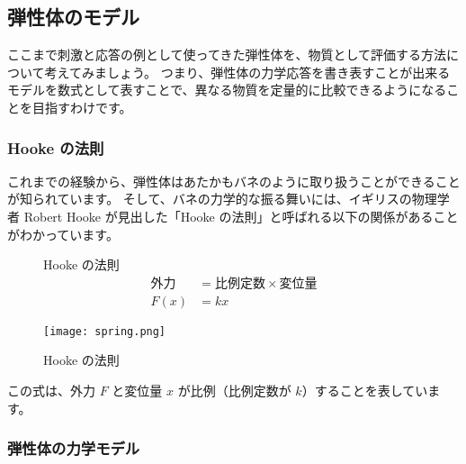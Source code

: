 \documentclass[uplatex,dvipdfmx,a4paper,11pt]{jsreport}
\begin{document}
\subsection{弾性体のモデル}

ここまで刺激と応答の例として使ってきた弾性体を、物質として評価する方法について考えてみましょう。
つまり、弾性体の力学応答を書き表すことが出来るモデルを数式として表すことで、異なる物質を定量的に比較できるようになることを目指すわけです。

\subsubsection{Hooke の法則}

これまでの経験から、弾性体はあたかもバネのように取り扱うことができることが知られています。
そして、バネの力学的な振る舞いには、イギリスの物理学者 Robert Hooke が見出した「Hooke の法則」と呼ばれる以下の関係があることがわかっています。
\begin{figure}[htb]
	\begin{center}
		\begin{minipage}{0.45\textwidth}
			\large
			\begin{itembox}[l]{Hooke の法則}
				\vspace{-3mm}
				\begin{align*}
					\text{外力} &= \text{比例定数} \times \text{変位量} \\[8pt]
					F(x) &= k x
				\end{align*}
			\end{itembox}
		\end{minipage}
		\begin{minipage}{0.45\textwidth}
			\begin{center}
			\texttt{[image: spring.png]}
			\end{center}
		\end{minipage}
		\caption{Hooke の法則}
		\label{hook}
	\end{center}
\end{figure}

この式は、外力 $F$ と変位量 $x$ が比例（比例定数が $k$）することを表しています。

\subsubsection{弾性体の力学モデル}
\end{document}
